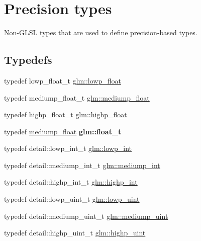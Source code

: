 \hypertarget{group__core__precision}{}\section{Precision types}
\label{group__core__precision}


Non-\/\+G\+L\+SL types that are used to define precision-\/based types.  


\subsection*{Typedefs}
\begin{DoxyCompactItemize}
\item 
typedef lowp\+\_\+float\+\_\+t \hyperlink{group__core__precision_ga2887fbc729ac5c1c5caeb7cd57a7145c}{glm\+::lowp\+\_\+float}
\item 
typedef mediump\+\_\+float\+\_\+t \hyperlink{group__core__precision_gac785826c039fe6c97c03b37c81c1a68e}{glm\+::mediump\+\_\+float}
\item 
typedef highp\+\_\+float\+\_\+t \hyperlink{group__core__precision_ga3d443a093adc053638ed7f81c5bfe300}{glm\+::highp\+\_\+float}
\item 
\mbox{\label{group__core__precision_gae01b87f81bd15327230bf1b47c482b24}} 
typedef \hyperlink{group__core__precision_gac785826c039fe6c97c03b37c81c1a68e}{mediump\+\_\+float} {\bfseries glm\+::float\+\_\+t}
\item 
typedef detail\+::lowp\+\_\+int\+\_\+t \hyperlink{group__core__precision_ga4681244bf4a184734f03aa9df4e3d288}{glm\+::lowp\+\_\+int}
\item 
typedef detail\+::mediump\+\_\+int\+\_\+t \hyperlink{group__core__precision_ga2a3dcbcd7f4e17663d393a12061ac6ac}{glm\+::mediump\+\_\+int}
\item 
typedef detail\+::highp\+\_\+int\+\_\+t \hyperlink{group__core__precision_gaafed5240eb0a43328cb75faf5fb0a8c2}{glm\+::highp\+\_\+int}
\item 
typedef detail\+::lowp\+\_\+uint\+\_\+t \hyperlink{group__core__precision_ga8077c90f2c87e419ea6c273157dcc1fc}{glm\+::lowp\+\_\+uint}
\item 
typedef detail\+::mediump\+\_\+uint\+\_\+t \hyperlink{group__core__precision_ga08ae38ad78ade3539fdd1d25052b8c51}{glm\+::mediump\+\_\+uint}
\item 
typedef detail\+::highp\+\_\+uint\+\_\+t \hyperlink{group__core__precision_gabfd1cf11193324a5f77d3831b6ac3205}{glm\+::highp\+\_\+uint}

\end{DoxyCompactItemize}

